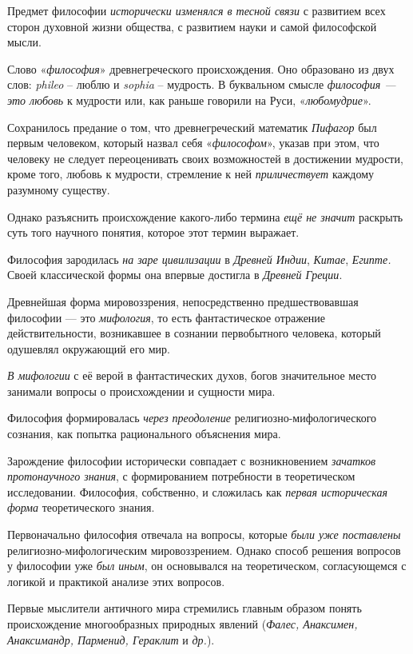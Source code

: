 \documentclass[a4paper,14pt,russian]{extreport}
\begin{document}
Предмет философии \emph{исторически изменялся в тесной связи} с развитием всех сторон духовной жизни общества, с развитием науки и самой философской мысли.

Слово «\emph{философия}» древнегреческого происхождения. Оно образовано из двух слов: \emph{phileo} -- люблю и \emph{sophia} -- мудрость. В буквальном смысле \emph{философия --- это любовь} к мудрости или, как раньше говорили на Руси, «\emph{любомудрие}».

Сохранилось предание о том, что древнегреческий математик \emph{Пифагор} был первым человеком, который назвал себя «\emph{философом}», указав при этом, что человеку не следует переоценивать своих возможностей в достижении мудрости, кроме того, любовь к мудрости, стремление к ней \emph{приличествует} каждому разумному существу.

Однако разъяснить происхождение какого-либо термина \emph{ещё не значит} раскрыть суть того научного понятия, которое этот термин выражает.

Философия зародилась \emph{на заре цивилизации} в \emph{Древней Индии}, \emph{Китае}, \emph{Египте.} Своей классической формы она впервые достигла в \emph{Древней Греции}.

Древнейшая форма мировоззрения, непосредственно предшествовавшая философии --- это \emph{мифология}, то есть фантастическое отражение действительности, возникавшее в сознании первобытного человека, который одушевлял окружающий его мир.

\emph{В мифологии} с её верой в фантастических духов, богов значительное место занимали вопросы о происхождении и сущности мира.

Философия формировалась \emph{через преодоление} религиозно-мифологического сознания, как попытка рационального объяснения мира.

Зарождение философии исторически совпадает с возникновением \emph{зачатков протонаучного знания}, с формированием потребности в теоретическом исследовании. Философия, собственно, и сложилась как \emph{первая историческая форма} теоретического знания.

Первоначально философия отвечала на вопросы, которые \emph{были уже поставлены} религиозно-мифологическим мировоззрением. Однако способ решения вопросов у философии уже \emph{был иным}, он основывался на теоретическом, согласующемся с логикой и практикой анализе этих вопросов.

Первые мыслители античного мира стремились главным образом понять происхождение многообразных природных явлений (\emph{Фалес, Анаксимен, Анаксимандр, Парменид, Гераклит} и \emph{др.}).
\end{document}
